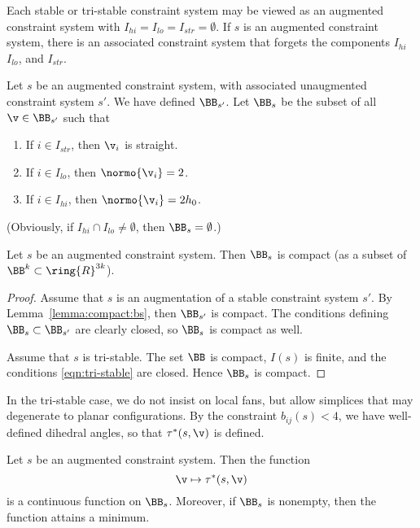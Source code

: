 Each stable or tri-stable constraint system may be
viewed as an augmented constraint system with $I_{hi}=I_{lo}=I_{str}=\emptyset$.
If $s$ is an augmented constraint
system, there is an associated constraint system that forgets the components
$I_{hi}$ $I_{lo}$, and $I_{str}$.

\begin{definition}  Let $s$ be an augmented constraint system, with
associated unaugmented constraint system $s'$.
We have defined $\BB_{s'}$. Let $\BB_{s}$ be the subset of all  $\v\in\BB_{s'}$ such that
\begin{enumerate}
\item If $i\in I_{str}$,  then $\v_i$ is straight.
\item If $i\in I_{lo}$,  then $\normo{\v_i}=2$.
\item If $i\in I_{hi}$,  then $\normo{\v_i}=2h_0$.
\end{enumerate}
\end{definition}



(Obviously, if $I_{hi}\cap I_{lo}\ne \emptyset$, then $\BB_s=\emptyset$.)

\begin{lemma} \label{lemma:aug-compact}
Let $s$ be an augmented constraint system. Then
$\BB_s$ is compact (as a subset of
$\BB^k \subset \ring{R}^{3k}$).
\end{lemma}

\begin{proof}  Assume that $s$ is an augmentation of a stable constraint 
system $s'$.
By Lemma~\ref{lemma:compact:bs},  then $\BB_{s'}$ is compact.  
The conditions defining $\BB_s\subset \BB_{s'}$ are clearly closed, so
$\BB_s$ is compact as well.

Assume that $s$ is tri-stable.  The set $\BB$ is compact, $I(s)$ is finite,
and the conditions \eqref{eqn:tri-stable} are closed.  Hence $\BB_s$ is
compact.
\end{proof}

 In the tri-stable case, we do not insist on local fans, but allow simplices that
may  degenerate to planar configurations.  By the constraint $b_{ij}(s)<4$, we have well-defined dihedral angles, so that $\tau^*(s,\v)$ is defined.

\begin{lemma}[continuity]\label{lemma:compact-fan}
Let $s$ be an augmented constraint system.  Then the function 
\[
\v\mapsto \tau^*(s,\v)
\]
is a continuous function on $\BB_s$.  Moreover, if $\BB_s$ is
nonempty, then the function attains a minimum.
\end{lemma}

